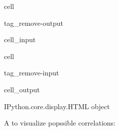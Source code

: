 \documentclass[letterpaper,10pt,english]{jupyterBook}
\begin{document}
\begin{sphinxuseclass}{cell}
\begin{sphinxuseclass}{tag_remove-output}\begin{sphinxVerbatimInput}

\begin{sphinxuseclass}{cell_input}
\begin{sphinxVerbatim}[commandchars=\\\{\}]
   
   

    
\end{sphinxVerbatim}

\end{sphinxuseclass}\end{sphinxVerbatimInput}

\end{sphinxuseclass}
\end{sphinxuseclass}
\begin{sphinxuseclass}{cell}
\begin{sphinxuseclass}{tag_remove-input}\begin{sphinxVerbatimOutput}

\begin{sphinxuseclass}{cell_output}
\begin{sphinxVerbatim}[commandchars=\\\{\}]
\PYGZlt{}IPython.core.display.HTML object\PYGZgt{}
\end{sphinxVerbatim}

\end{sphinxuseclass}\end{sphinxVerbatimOutput}

\end{sphinxuseclass}
\end{sphinxuseclass}
\sphinxAtStartPar
A  to visualize popssible correlations:
\end{document}
